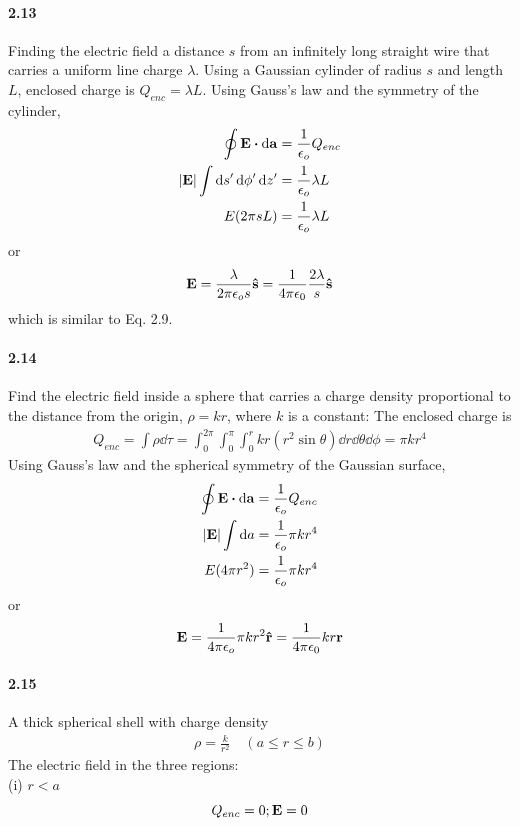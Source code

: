 \documentclass[../main.tex]{subfiles}
\begin{document}
\paragraph{2.13}
Finding the electric field a distance $s$ from an infinitely long straight wire that carries a
uniform line charge $\lambda$. Using a Gaussian cylinder of radius $s$ and length $L$, 
enclosed charge is $Q_{enc} = \lambda L$. Using Gauss's law and the symmetry of the cylinder,
\begin{align*}
    \oint \vb{E} \vdot \dd{\vb{a}} &= \frac{1}{\epsilon_o} Q_{enc} \\
    \abs{\vb{E}} \int \dd{s'}\dd{\phi'}\dd{z'} &= \frac{1}{\epsilon_o} \lambda L \\
    E (2\pi s L) &= \frac{1}{\epsilon_o} \lambda L
\end{align*}
or
\begin{align*}
    \vb{E} = \frac{\lambda}{2\pi\epsilon_o s} \vu{s} = \frac{1}{4\pi\epsilon_0} \frac{2\lambda}{s} \vu{s}
\end{align*}
which is similar to Eq. 2.9.

\paragraph{2.14}
Find the electric field inside a sphere that carries a charge density proportional to the distance
from the origin, $\rho = kr$, where $k$ is a constant: The enclosed charge is
\begin{align*}
    Q_{enc} = \int \rho \dd{\tau} = \int_0^{2\pi} \int_0^\pi \int_0^r kr (r^2 \sin\theta) \dd{r}
        \dd{\theta} \dd{\phi} = \pi k r^4
\end{align*}
Using Gauss's law and the spherical symmetry of the Gaussian surface,
\begin{align*}
    \oint \vb{E} \vdot \dd{\vb{a}} &= \frac{1}{\epsilon_o} Q_{enc} \\
    \abs{\vb{E}} \int \dd{a} &= \frac{1}{\epsilon_o} \pi k r^4 \\
    E (4\pi r^2) &= \frac{1}{\epsilon_o} \pi k r^4
\end{align*}
or 
\begin{align*}
    \vb{E} = \frac{1}{4\pi\epsilon_o} \pi k r^2 \vu{r} = \frac{1}{4\pi\epsilon_0} kr\vb{r}
\end{align*}

\paragraph{2.15}
A thick spherical shell with charge density
\begin{align*}
    \rho = \frac{k}{r^2} \quad (a\leq r \leq b)
\end{align*}
The electric field in the three regions: \\
(i) \(r<a\)
\[ Q_{enc} = 0; \vb{E} = 0 \]
\end{document}
